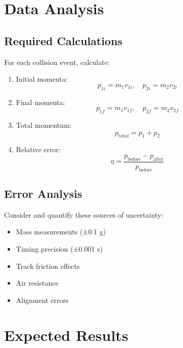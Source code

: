 \documentclass[12pt]{article}
\begin{document}
\section{Data Analysis}

\subsection{Required Calculations}
For each collision event, calculate:

\begin{enumerate}
    \item Initial momenta:
        \begin{equation}
            p_{1i} = m_1v_{1i}, \quad p_{2i} = m_2v_{2i}
        \end{equation}
    
    \item Final momenta:
        \begin{equation}
            p_{1f} = m_1v_{1f}, \quad p_{2f} = m_2v_{2f}
        \end{equation}
    
    \item Total momentum:
        \begin{equation}
            p_{\text{total}} = p_1 + p_2
        \end{equation}
    
    \item Relative error:
        \begin{equation}
            \eta = \frac{p_{\text{before}} - p_{\text{after}}}{p_{\text{before}}}
        \end{equation}
\end{enumerate}

\subsection{Error Analysis}
Consider and quantify these sources of uncertainty:
\begin{itemize}
    \item Mass measurements (±0.1 g)
    \item Timing precision (±0.001 s)
    \item Track friction effects
    \item Air resistance
    \item Alignment errors
\end{itemize}

\section{Expected Results}
\end{document}
